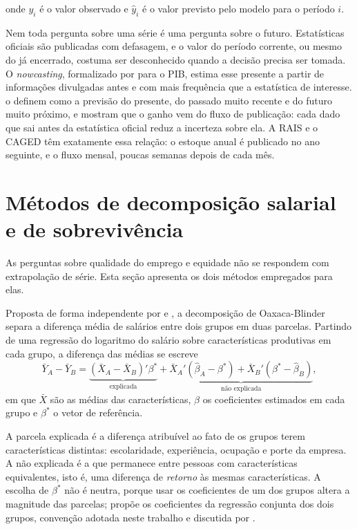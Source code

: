 onde $y_i$ é o valor observado e $\hat{y}_i$ é o valor previsto pelo modelo para o período $i$.

Nem toda pergunta sobre uma série é uma pergunta sobre o futuro. Estatísticas oficiais são publicadas com defasagem, e o valor do período corrente, ou mesmo do já encerrado, costuma ser desconhecido quando a decisão precisa ser tomada. O \textit{nowcasting}, formalizado por  para o PIB, estima esse presente a partir de informações divulgadas antes e com mais frequência que a estatística de interesse.  o definem como a previsão do presente, do passado muito recente e do futuro muito próximo, e mostram que o ganho vem do fluxo de publicação: cada dado que sai antes da estatística oficial reduz a incerteza sobre ela. A RAIS e o CAGED têm exatamente essa relação: o estoque anual é publicado no ano seguinte, e o fluxo mensal, poucas semanas depois de cada mês.

\section{Métodos de decomposição salarial e de sobrevivência}
\label{subsec:sobrevivencia}

As perguntas sobre qualidade do emprego e equidade não se respondem com extrapolação de série. Esta seção apresenta os dois métodos empregados para elas.

\label{subsec:oaxaca}

Proposta de forma independente por  e , a decomposição de Oaxaca-Blinder separa a diferença média de salários entre dois grupos em duas parcelas. Partindo de uma regressão do logaritmo do salário sobre características produtivas em cada grupo, a diferença das médias se escreve
\begin{equation}
    \bar{Y}_A - \bar{Y}_B =
    \underbrace{(\bar{X}_A - \bar{X}_B)'\beta^{*}}_{\text{explicada}} +
    \underbrace{\bar{X}_A'(\hat{\beta}_A - \beta^{*}) + \bar{X}_B'(\beta^{*} - \hat{\beta}_B)}_{\text{não explicada}},
\end{equation}
em que $\bar{X}$ são as médias das características, $\hat{\beta}$ os coeficientes estimados em cada grupo e $\beta^{*}$ o vetor de referência.

A parcela explicada é a diferença atribuível ao fato de os grupos terem características distintas: escolaridade, experiência, ocupação e porte da empresa. A não explicada é a que permanece entre pessoas com características equivalentes, isto é, uma diferença de \textit{retorno} às mesmas características. A escolha de $\beta^{*}$ não é neutra, porque usar os coeficientes de um dos grupos altera a magnitude das parcelas;  propõe os coeficientes da regressão conjunta dos dois grupos, convenção adotada neste trabalho e discutida por .

